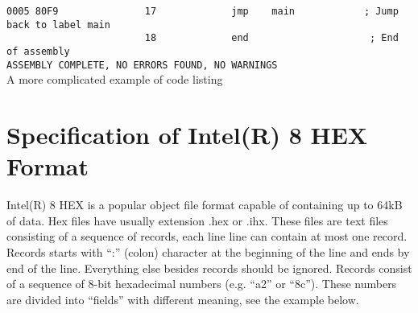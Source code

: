 \begin{code}[h]
                        {\color{highlight_lst_address}\verb'0005'}{\color{highlight_lst_code}\verb' 80F9'}{\color{highlight_lst_line}\verb'               17'}\verb'             '{\color{highlight_instruction}\verb'jmp'}\verb'    '{\color{highlight_constant}\verb'main'}\verb'            '{\color{highlight_comment}\verb'; Jump back to label main'}\\
                        {\color{highlight_lst_line}\verb'                        18'}\verb'             '{\color{highlight_directive}\verb'end'}\verb'                     '{\color{highlight_comment}\verb'; End of assembly'}\\
                        {\color{highlight_lst_msg}\verb'ASSEMBLY COMPLETE,'}\verb' NO ERRORS FOUND, NO WARNINGS'\\
                        \caption{A more complicated example of code listing}
                \end{code}

        \section{Specification of Intel(R) 8 HEX Format}
                Intel(R) 8 HEX is a popular object file format capable of containing up to
       64kB of data. Hex files have usually extension .hex or .ihx. These files are text files
       consisting of a sequence of records, each line line can contain at most one record.
       Records starts with ``:'' (colon) character at the beginning of the line and ends by
       end of the line. Everything else besides records should be ignored. Records consist
       of a sequence of 8-bit hexadecimal numbers (e.g. ``a2'' or ``8c''). These numbers are
       divided into ``fields'' with different meaning, see the example below.

